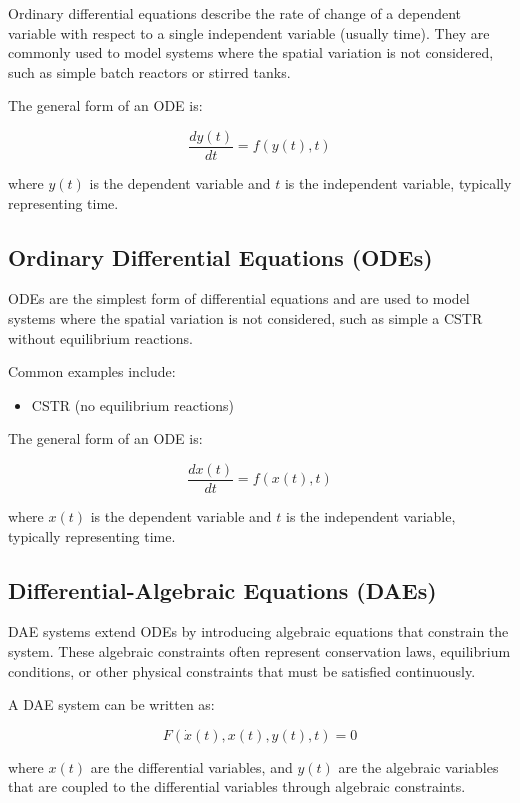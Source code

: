 \documentclass{article}
\begin{document}
Ordinary differential equations describe the rate of change of a dependent variable with respect to a single independent variable (usually time). They are commonly used to model systems where the spatial variation is not considered, such as simple batch reactors or stirred tanks.

The general form of an ODE is:

\[
\frac{dy(t)}{dt} = f(y(t), t)
\]

where \(y(t)\) is the dependent variable and \(t\) is the independent variable, typically representing time.

\subsection{Ordinary Differential Equations (ODEs)}

ODEs are the simplest form of differential equations and are used to model systems where the spatial variation is not considered, such as simple a CSTR without equilibrium reactions.

Common examples include:

\begin{itemize}
    \item CSTR (no equilibrium reactions)
\end{itemize}

The general form of an ODE is:

\[
\frac{dx(t)}{dt} = f(x(t), t)
\]

where \(x(t)\) is the dependent variable and \(t\) is the independent variable, typically representing time.

\subsection{Differential-Algebraic Equations (DAEs)}

DAE systems extend ODEs by introducing algebraic equations that constrain the system. These algebraic constraints often represent conservation laws, equilibrium conditions, or other physical constraints that must be satisfied continuously.


A DAE system can be written as:

\begin{equation}
    F\left( \dot{x}(t), x(t), y(t), t \right) = 0
\end{equation}

where \(x(t)\) are the differential variables, and \(y(t)\) are the algebraic variables that are coupled to the differential variables through algebraic constraints.
\end{document}
